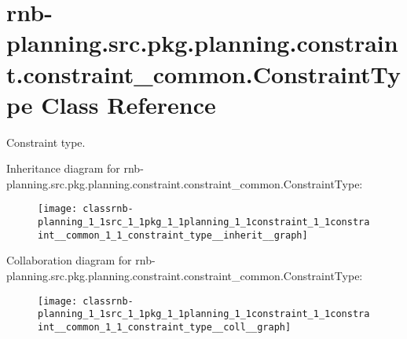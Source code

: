 \hypertarget{classrnb-planning_1_1src_1_1pkg_1_1planning_1_1constraint_1_1constraint__common_1_1_constraint_type}{}\section{rnb-\/planning.src.\+pkg.\+planning.\+constraint.\+constraint\+\_\+common.\+Constraint\+Type Class Reference}
\label{classrnb-planning_1_1src_1_1pkg_1_1planning_1_1constraint_1_1constraint__common_1_1_constraint_type}


Constraint type.  




Inheritance diagram for rnb-\/planning.src.\+pkg.\+planning.\+constraint.\+constraint\+\_\+common.\+Constraint\+Type\+:
\nopagebreak
\begin{figure}[H]
\begin{center}
\leavevmode
\texttt{[image: classrnb-planning\_1\_1src\_1\_1pkg\_1\_1planning\_1\_1constraint\_1\_1constraint\_\_common\_1\_1\_constraint\_type\_\_inherit\_\_graph]}
\end{center}
\end{figure}


Collaboration diagram for rnb-\/planning.src.\+pkg.\+planning.\+constraint.\+constraint\+\_\+common.\+Constraint\+Type\+:
\nopagebreak
\begin{figure}[H]
\begin{center}
\leavevmode
\texttt{[image: classrnb-planning\_1\_1src\_1\_1pkg\_1\_1planning\_1\_1constraint\_1\_1constraint\_\_common\_1\_1\_constraint\_type\_\_coll\_\_graph]}
\end{center}
\end{figure}
